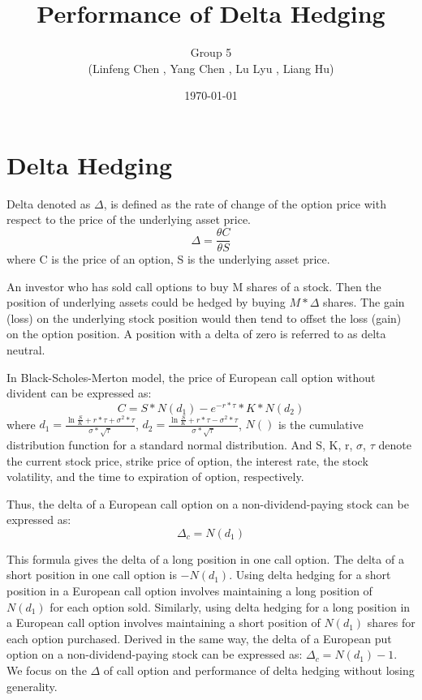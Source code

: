 \documentclass{article}
\begin{document}
\title{\bfseries Performance of Delta Hedging}
\author{Group 5 \\   \small (Linfeng Chen , Yang Chen , Lu Lyu , Liang Hu)}
\date{\today}

\maketitle 


\section*{Delta Hedging}
\setlength{\parindent}{1 em}
Delta denoted as $ \Delta $, is defined as the rate of change of the option price with respect to the price of the underlying asset price.
\[\Delta= \frac{\theta{C}}{\theta{S}} \]
where C is the price of an option, S is the underlying asset price.

An investor who has sold call options to buy M shares of a stock. Then the position of underlying assets could be hedged by buying $ M*\Delta $ shares. The gain (loss) on the underlying stock position would then tend to offset the loss (gain) on the option position. A position with a delta of zero is referred to as delta neutral.

In Black-Scholes-Merton model, the price of European call option without divident can be expressed as:
\[ C= S*N(d_{1})-e^{-r*\tau} *K*N(d_{2})\]
where  $ d_{1}=\frac{\ln \frac{S}{K} + r*\tau+ \sigma^2 * \tau}{\sigma*\sqrt{ \tau}} $, $ d_{2}=\frac{\ln \frac{S}{K} + r*\tau - \sigma^2 * \tau}{\sigma*\sqrt{ \tau}} $, $N()$ 
is the cumulative distribution function for a standard normal distribution. And S, K, r, $\sigma$, $\tau$ denote the current stock price, strike price of option, the interest rate, the stock volatility, and the time to expiration of option, respectively.

Thus, the delta of a European call option on a non-dividend-paying stock can be expressed as:
\[ \Delta_{c}=N(d_{1}) \]

This formula gives the delta of a long position in one call option. The delta of a short position in one call option is $−N(d_{1})$. Using delta hedging for a short position in a European call option involves maintaining a long position of $N(d_{1})$ for each option sold. Similarly, using delta hedging for a long position in a European call option involves maintaining a short position of $N(d_{1})$ shares for each option purchased.
Derived in the same way, the delta of a European put option on a non-dividend-paying stock can be expressed as: $ \Delta_{c}=N(d_{1})-1$. We focus on the $\Delta$ of call option and performance of delta hedging without losing generality. 
\end{document}

